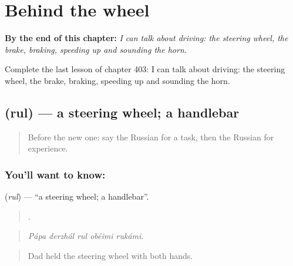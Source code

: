 
\chapter{Behind the wheel}
\label{ch:ru-behind-the-wheel}

\begin{chapteropening}
\textbf{By the end of this chapter:} \emph{I can talk about driving: the steering wheel, the brake, braking, speeding up and sounding the horn.}

Complete the last lesson of chapter 403: I can talk about driving: the steering wheel, the brake, braking, speeding up and sounding the horn.
\end{chapteropening}

\section[\texorpdfstring{\ru{руль} (rul)}{руль (rul)}]{ (rul) — a steering wheel; a handlebar}

\label{lesson:RU-C403-rul}



\begin{quote}
Before the new one: say the Russian for a task, then the Russian for experience.
\end{quote}

\subsection*{You'll want to know: }
\textbf{} (\emph{rul}) — \textquotedblleft{}a steering wheel; a handlebar\textquotedblright{}.

\begin{quote}
    .
\end{quote}

\begin{quote}
\emph{Pápa derzhál rul obéimi rukámi.}
\end{quote}

\begin{quote}
Dad held the steering wheel with both hands.
\end{quote}

